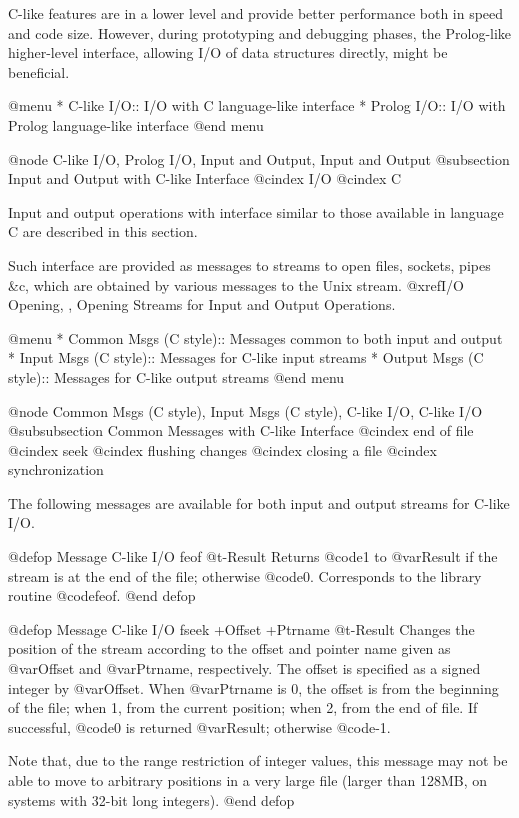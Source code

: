 {{{{C-like features are in a lower level and provide better performance both
in speed and code size.  However, during prototyping and debugging
phases, the Prolog-like higher-level interface, allowing I/O of data
structures directly, might be beneficial.

@menu
* C-like I/O::                  I/O with C language-like interface
* Prolog I/O::                  I/O with Prolog language-like interface
@end menu

@node C-like I/O, Prolog I/O, Input and Output, Input and Output
@subsection Input and Output with C-like Interface
@cindex I/O
@cindex C

Input and output operations with interface similar to those available in
language C are described in this section.

Such interface are provided as messages to streams to open files,
sockets, pipes &c, which are obtained by various messages to the Unix
stream.  @xref{I/O Opening, , Opening Streams for Input and Output
Operations}.

@menu
* Common Msgs (C style)::       Messages common to both input and output
* Input Msgs (C style)::        Messages for C-like input streams
* Output Msgs (C style)::       Messages for C-like output streams
@end menu

@node Common Msgs (C style), Input Msgs (C style), C-like I/O, C-like I/O
@subsubsection Common Messages with C-like Interface
@cindex end of file
@cindex seek
@cindex flushing changes
@cindex closing a file
@cindex synchronization

The following messages are available for both input and output streams
for C-like I/O.

@defop {Message} {C-like I/O} feof @t{-}Result
Returns @code{1} to @var{Result} if the stream is at the end of the
file; otherwise @code{0}.  Corresponds to the library routine
@code{feof}.
@end defop

@defop {Message} {C-like I/O} fseek +Offset +Ptrname @t{-}Result
Changes the position of the stream according to the offset and pointer
name given as @var{Offset} and @var{Ptrname}, respectively.  The offset
is specified as a signed integer by @var{Offset}.  When @var{Ptrname} is
0, the offset is from the beginning of the file; when 1, from the
current position; when 2, from the end of file.  If successful, @code{0}
is returned @var{Result}; otherwise @code{-1}.

Note that, due to the range restriction of integer values, this message
may not be able to move to arbitrary positions in a very large file
(larger than 128MB, on systems with 32-bit long integers).
@end defop

}}}}
